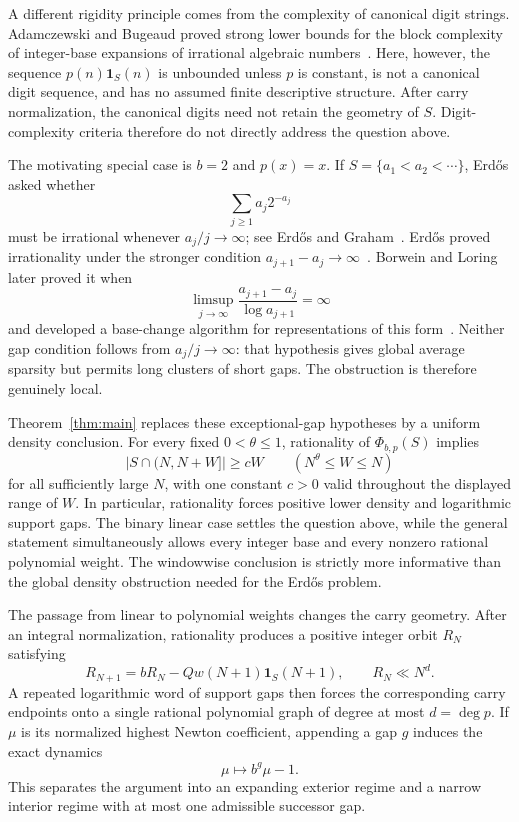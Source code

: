 \documentclass[10pt,a4paper]{amsart}
\begin{document}
A different rigidity principle comes from the complexity of canonical digit
strings. Adamczewski and Bugeaud proved strong lower bounds for the block
complexity of integer-base expansions of irrational algebraic
numbers~\cite{AdamczewskiBugeaud}. Here, however, the sequence
$p(n)\mathbf1_S(n)$ is unbounded unless $p$ is constant, is not a canonical
digit sequence, and has no assumed finite descriptive structure. After carry
normalization, the canonical digits need not retain the geometry of $S$.
Digit-complexity criteria therefore do not directly address the question
above.

The motivating special case is $b=2$ and $p(x)=x$. If
$S=\{a_1<a_2<\cdots\}$, Erd\H{o}s asked whether
\[
 \sum_{j\ge1}a_j2^{-a_j}
\]
must be irrational whenever $a_j/j\to\infty$; see Erd\H{o}s and
Graham~\cite{ErdosGraham}. Erd\H{o}s proved irrationality under the stronger
condition $a_{j+1}-a_j\to\infty$~\cite{Erdos1981}. Borwein and Loring later
proved it when
\[
 \limsup_{j\to\infty}
 \frac{a_{j+1}-a_j}{\log a_{j+1}}=\infty
\]
and developed a base-change algorithm for representations of this
form~\cite{BorweinLoring}. Neither gap condition follows from
$a_j/j\to\infty$: that hypothesis gives global average sparsity but permits
long clusters of short gaps. The obstruction is therefore genuinely local.

Theorem~\ref{thm:main} replaces these exceptional-gap hypotheses by a
uniform density conclusion. For every fixed $0<\theta\le1$, rationality of
$\Phi_{b,p}(S)$ implies
\[
 |S\cap(N,N+W]|\ge cW
 \qquad (N^\theta\le W\le N)
\]
for all sufficiently large $N$, with one constant $c>0$ valid throughout
the displayed range of $W$. In particular, rationality forces positive lower
density and logarithmic support gaps. The binary linear case settles the
question above, while the general statement simultaneously allows every
integer base and every nonzero rational polynomial weight. The windowwise
conclusion is strictly more informative than the global density obstruction
needed for the Erd\H{o}s problem.

The passage from linear to polynomial weights changes the carry geometry.
After an integral normalization, rationality produces a positive integer
orbit $R_N$ satisfying
\[
 R_{N+1}=bR_N-Qw(N+1)\mathbf1_S(N+1),\qquad R_N\ll N^d.
\]
A repeated logarithmic word of support gaps then forces the corresponding
carry endpoints onto a single rational polynomial graph of degree at most
$d=\deg p$. If $\mu$ is its normalized highest Newton coefficient, appending
a gap $g$ induces the exact dynamics
\[
 \mu\longmapsto b^g\mu-1.
\]
This separates the argument into an expanding exterior regime and a narrow
interior regime with at most one admissible successor gap.
\end{document}

